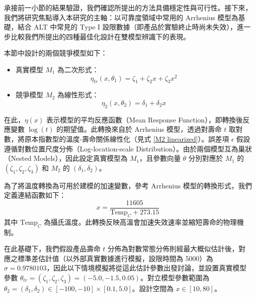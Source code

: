 \hspace*{8mm} 承接前一小節的結果驗證，我們確認所提出的方法具備穩定性與可行性。接下來，我們將研究焦點導入本研究的主軸：以可靠度領域中常用的 Arrhenius 模型為基礎，結合 ALT 中常見的 Type I 設限數據（即產品於實驗終止時尚未失效），進一步比較我們所提出的四種最佳化設計在雙模型辨識下的表現。

本節中設計的兩個競爭模型如下：

\begin{itemize}
\item 真實模型 $M_1$ 為二次形式：
\begin{equation}\label{DeviceA_truemodel}
\eta_{tr}(x,\theta_1)=\zeta_1+\zeta_2x+\zeta_3x^2
\end{equation}

\item 競爭模型 $M_2$ 為線性形式：
\begin{equation}\label{DeviceA_rivalmodel}
\eta_{2}(x,\theta_2)=\delta_1+\delta_2x
\end{equation}

\end{itemize}

\hspace*{8mm} 在此，$\eta(x)$ 表示模型的平均反應函數（Mean Response Function），即轉換後反應變數 $\log(t)$ 的期望值。此轉換來自於 Arrhenius 模型，透過對壽命 $t$ 取對數，將原本指數型的溫度-壽命關係線性化（見式 \eqref{M2 linearized}）。誤差項 $\epsilon$ 假設遵循對數位置尺度分佈（Log-location-scale Distribution）。由於兩個模型互為巢狀（Nested Models），因此設定真實模型為 $M_1$，且參數向量 $\theta$ 分別對應於 $M_1$ 的 $(\zeta_1, \zeta_2, \zeta_3)$ 和 $M_2$ 的 $(\delta_1, \delta_2)$。

\hspace*{8mm} 為了將溫度轉換為可用於建模的加速變數，參考 Arrhenius 模型的轉換形式，我們定義連結函數如下：
\begin{equation}\label{link_function}
x = \frac{11605}{\text{Temp}_C + 273.15}
\end{equation}
其中 $\text{Temp}_C$ 為攝氏溫度。此轉換反映高溫會加速失效速率並縮短壽命的物理機制。

\hspace*{8mm} 在此基礎下，我們假設產品壽命 $t$ 分佈為對數常態分佈則經最大概似估計後，對應之標準差估計值（以外部真實數據進行模擬，設限時間為 5000）為 $\hat{\sigma} = 0.9780103$，因此以下情境模擬將從這此估計參數出發討論，並設置真實模型參數 $\theta_{tr} = (\zeta_1, \zeta_2, \zeta_3) = (-5.0, -1.5, 0.05)$。對立模型參數範圍為 $\theta_2 = (\delta_1, \delta_2) \in [-100, -10] \times [0.1, 5.0]$。設計空間為 $x\in [10,80]$。

